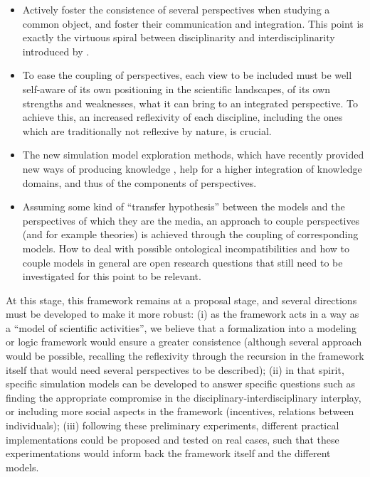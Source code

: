 \begin{itemize}
	\item Actively foster the consistence of several perspectives when studying a common object, and foster their communication and integration. This point is exactly the virtuous spiral between disciplinarity and interdisciplinarity introduced by \cite{banos2013pour}.
	\item To ease the coupling of perspectives, each view to be included must be well self-aware of its own positioning in the scientific landscapes, of its own strengths and weaknesses, what it can bring to an integrated perspective. To achieve this, an increased reflexivity of each discipline, including the ones which are traditionally not reflexive by nature, is crucial.
	\item The new simulation model exploration methods, which have recently provided new ways of producing knowledge \cite{pumain2017urban}, help for a higher integration of knowledge domains, and thus of the components of perspectives.
	\item Assuming some kind of ``transfer hypothesis'' between the models and the perspectives of which they are the media, an approach to couple perspectives (and for example theories) is achieved through the coupling of corresponding models. How to deal with possible ontological incompatibilities and how to couple models in general are open research questions that still need to be investigated for this point to be relevant.
\end{itemize}


At this stage, this framework remains at a proposal stage, and several directions must be developed to make it more robust: (i) as the framework acts in a way as a ``model of scientific activities'', we believe that a formalization into a modeling or logic framework would ensure a greater consistence (although several approach would be possible, recalling the reflexivity through the recursion in the framework itself that would need several perspectives to be described); (ii) in that spirit, specific simulation models can be developed to answer specific questions such as finding the appropriate compromise in the disciplinary-interdisciplinary interplay, or including more social aspects in the framework (incentives, relations between individuals); (iii) following these preliminary experiments, different practical implementations could be proposed and tested on real cases, such that these experimentations would inform back the framework itself and the different models.


